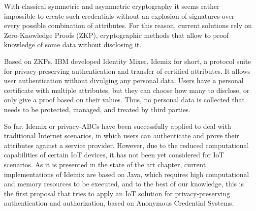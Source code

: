 With classical symmetric and asymmetric cryptography it seems rather impossible to create such credentials without an explosion of signatures over every possible combination of attributes. For this reason, current solutions rely on  Zero-Knowledge Proofs (ZKP), cryptographic methods that allow to proof knowledge of some data without disclosing it.

Based on ZKPs, IBM developed Identity Mixer,
Idemix for short, a protocol suite for privacy-preserving authentication and transfer of certified attributes. It allows user authentication without divulging any personal data. Users have a personal certificate with multiple attributes, but they can choose how many to disclose, or only give a proof based on their values. Thus, no personal data is collected that needs to be protected, managed, and treated by third parties.


So far, Idemix or privacy-ABCs have been successfully applied to deal with traditional Internet scenarios, in which users can authenticate and prove their attributes against a service provider. However, due to the reduced computational capabilities of certain IoT devices, it has not been yet considered for IoT scenarios. As it is presented in the state of the art chapter, current implementations of Idemix are based on Java, which requires high computational and memory resources to be executed, and to the best of our knowledge, this is the first proposal that tries to apply an IoT solution for privacy-preserving authentication and authorization, based on Anonymous Credential Systems.



